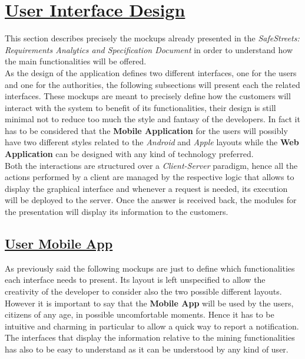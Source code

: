\section[User Interface Design]{\hyperlink{toc}{User Interface Design}} 
	\label{sec:userInterfaceDesign}
	
	This section describes precisely the mockups already presented in the \emph{SafeStreets: Requirements Analytics and Specification Document} \cite{RASD} in order to understand how the main functionalities will be offered.\\
	
	As the design of the application defines two different interfaces, one for the users and one for the authorities, the following subsections will present each the related interfaces. These mockups are meant to precisely define how the customers will interact with the system to benefit of its functionalities, their design is still minimal not to reduce too much the style and fantasy of the developers. In fact it has to be considered that the \textbf{Mobile Application} for the users will possibly have two different styles related to the \emph{Android} and \emph{Apple} layouts while the \textbf{Web Application} can be designed with any kind of technology preferred.\\
	
	Both the interactions are structured over a \emph{Client-Server} paradigm, hence all the actions performed by a client are managed by the respective logic that allows to display the graphical interface and whenever a request is needed, its execution will be deployed to the server. Once the answer is received back, the modules for the presentation will display its information to the customers.
	
	\subsection[User Mobile App]{\hyperlink{toc}{User Mobile App}}
		\label{sec:userMobileApp}
		
		As previously said the following mockups are just to define which functionalities each interface needs to present. Its layout is left unspecified to allow the creativity of the developer to consider also the two possible different layouts. However it is important to say that the \textbf{Mobile App} will be used by the users, citizens of any age, in possible uncomfortable moments. Hence it has to be intuitive and charming in particular to allow a quick way to report a notification. The interfaces that display the information relative to the mining functionalities has also to be easy to understand as it can be understood by any kind of user.
		
